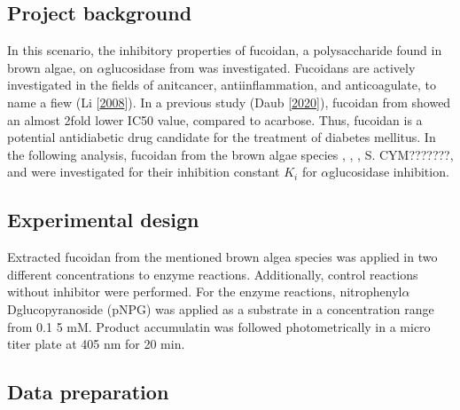 \documentclass[letterpaper,10pt,english]{jupyterBook}
\begin{document}
\subsection{Project background}
\label{\detokenize{scenarios/glycosidase_inhibition:project-background}}
\sphinxAtStartPar
In this scenario, the inhibitory properties of fucoidan, a polysaccharide found in brown algae, on \(\alpha\)\sphinxhyphen{}glucosidase from  was investigated. Fucoidans are actively investigated in the fields of anit\sphinxhyphen{}cancer, anti\sphinxhyphen{}inflammation, and anti\sphinxhyphen{}coagulate, to name a fiew (Li  {[}\hyperlink{cite.references:id7}{2008}{]}). In a previous study (Daub  {[}\hyperlink{cite.references:id6}{2020}{]}), fucoidan from  showed an almost 2\sphinxhyphen{}fold lower IC50 value, compared to acarbose. Thus, fucoidan is a potential antidiabetic drug candidate for the treatment of diabetes mellitus.
In the following analysis, fucoidan from the brown algae species , , , S. CYM???????, and  were investigated for their inhibition constant \(K_{i}\) for \(\alpha\)\sphinxhyphen{}glucosidase inhibition.


\subsection{Experimental design}
\label{\detokenize{scenarios/glycosidase_inhibition:experimental-design}}
\sphinxAtStartPar
Extracted fucoidan from the mentioned brown algea species was applied in two different concentrations to enzyme reactions. Additionally, control reactions without inhibitor were performed. For the enzyme reactions, \sphinxhyphen{}nitrophenyl\sphinxhyphen{}\(\alpha\)\sphinxhyphen{}D\sphinxhyphen{}glucopyranoside (pNPG) was applied as a substrate in a concentration range from 0.1 \sphinxhyphen{} 5 mM. Product accumulatin was followed photometrically in a micro titer plate at 405 nm for 20 min.


\subsection{Data preparation}
\label{\detokenize{scenarios/glycosidase_inhibition:data-preparation}}
\end{document}
